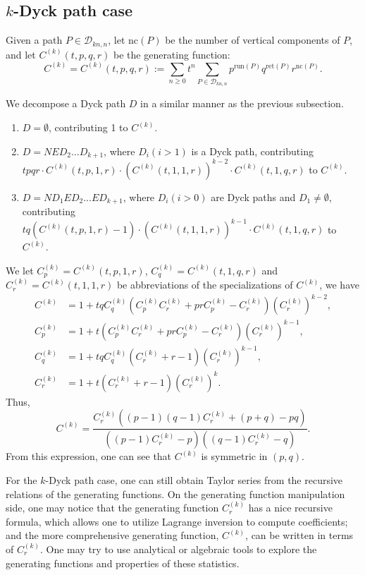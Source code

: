 \documentclass[11pt,a4paper,reqno]{article}
\newcommand{\DD}{\mathcal{D}}
\newcommand{\run}{\mathrm{run}}
\newcommand{\ret}{\mathrm{ret}}
\newcommand{\lvl}{\mathrm{nc}}
\begin{document}
{    
	\subsection{\texorpdfstring{$k$-Dyck path case}{k-Dyck path case}}
	Given a path $P\in\DD_{kn,n}$, let $\lvl(P)$ be the number of vertical components of $P$, and let
	$C^{(k)}(t,p,q,r)$ be the generating function:
	$$
	C^{(k)}=C^{(k)}(t,p,q,r):=\sum_{n\geq 0} t^n\sum_{P\in\DD_{kn,n}} p^{\run(P)} q^{\ret(P)} r^{\lvl(P)}.
	$$
	
	
	We decompose a Dyck path $D$ in a similar manner as the previous subsection.
	\begin{enumerate}[label=(\roman*)]
		\item $D=\emptyset$, contributing 1 to $C^{(k)}$.
		\item $D=NED_2...D_{k+1}$, where $D_i(i>1)$ is a Dyck path, contributing $tpqr\cdot C^{(k)}(t,p,1,r)\cdot(C^{(k)}(t,1,1,r))^{k-2}\cdot C^{(k)}(t,1,q,r)$ to $C^{(k)}$.
		\item $D=ND_1ED_2...ED_{k+1}$, where $D_i(i>0)$ are Dyck paths and $D_1\neq\emptyset$, contributing $tq(C^{(k)}(t,p,1,r)-1)\cdot (C^{(k)}(t,1,1,r))^{k-1}\cdot C^{(k)}(t,1,q,r)$ to $C^{(k)}$.
	\end{enumerate}
	We let $C^{(k)}_p=C^{(k)}(t,p,1,r)$, $C^{(k)}_q=C^{(k)}(t,1,q,r)$ and $C^{(k)}_r=C^{(k)}(t,1,1,r)$ be abbreviations of the specializations of $C^{(k)}$, we have
	\begin{align*}
		C^{(k)}&=1+tq C^{(k)}_q (C^{(k)}_p C^{(k)}_r + prC^{(k)}_p - C^{(k)}_r) (C^{(k)}_r)^{k-2},\\
		C^{(k)}_p&=1+t(C_p^{(k)} C_r^{(k)}+prC_p^{(k)}-C_r^{(k)})(C^{(k)}_r)^{k-1},\\
		C^{(k)}_q&=1+tq C_q^{(k)} (C^{(k)}_r+r-1)(C^{(k)}_r)^{k-1},\\
		C^{(k)}_r&=1+t(C^{(k)}_r+r-1)(C^{(k)}_r)^k.
	\end{align*}
	Thus,
	\begin{equation*}
		C^{(k)}=\frac{C^{(k)}_r\left((p-1)(q-1)C^{(k)}_r + (p+q)-pq\right)}{\left((p-1)C^{(k)}_r - p\right)\left((q-1)C^{(k)}_r-q\right)}.
	\end{equation*}
	From this expression, one can see that $C^{(k)}$ is symmetric in $(p,q)$.

For the $k$-Dyck path case, one can still obtain Taylor series from the recursive relations of the generating functions. On the generating function manipulation side, one may notice that the generating function $C^{(k)}_r$ has a nice recursive formula, which allows one to utilize Lagrange inversion to compute coefficients; and the more comprehensive generating function, $C^{(k)}$, can be written in terms of $C^{(k)}_r$. One may try to use analytical or algebraic tools to explore the generating functions and properties of these statistics.

}
\end{document}
